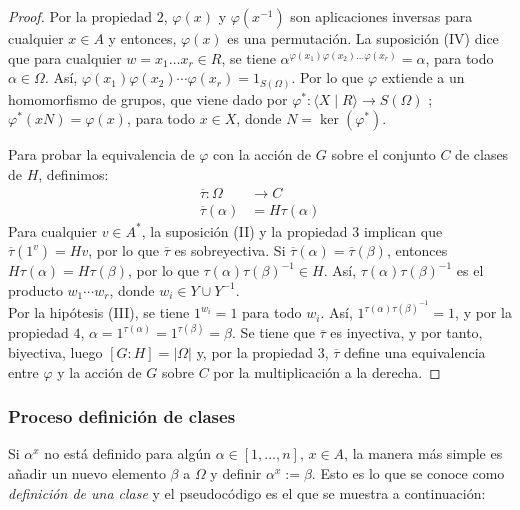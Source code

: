         \begin{proof}
        Por la propiedad $2$, $\varphi(x)$ y $\varphi(x^{-1})$ son aplicaciones inversas para cualquier $x\in A$ y entonces, $\varphi(x)$ es una permutación. La suposición (\RN{4}) dice que para cualquier $w=x_1 \ldots x_r \in R$, se tiene $\alpha^{\varphi(x_1) \varphi(x_2) \ldots \varphi(x_r)}=\alpha$, para todo $\alpha \in \Omega$. Así, $\varphi(x_1)\varphi(x_2)\cdots \varphi(x_r)=1_{S(\Omega)}$. Por lo que $\varphi$ extiende a un homomorfismo de grupos, que viene dado por $\varphi^* \colon \langle X \mid R \rangle \rightarrow S(\Omega)$ ; $\varphi^*(xN)=\varphi(x)$, para todo $x \in X $, donde $N=\operatorname{ker}(\varphi^*)$.
        
        Para probar la equivalencia de $\varphi$ con la acción de $G$ sobre el conjunto $C$ de clases de $H$, definimos:
        \begin{align*}
            \overline{\tau} \colon \Omega & \to C \\
            \overline{\tau}(\alpha) & = H \tau(\alpha) 
        \end{align*}
        Para cualquier $v \in A^*$, la suposición (\RN{2}) y la propiedad $3$ implican que $\overline{\tau}(1^v)=Hv$, por lo que $\overline{\tau}$ es sobreyectiva. Si  $\overline{\tau}(\alpha)= \overline{\tau}(\beta)$, entonces $H\tau(\alpha)=H\tau(\beta)$, por lo que $\tau(\alpha)\tau(\beta)^{-1} \in H$. Así, $\tau(\alpha)\tau(\beta)^{-1}$ es el producto $w_1\cdots w_r$, donde $w_i \in Y\cup Y^{-1}$. \\
        Por la hipótesis  (\RN{3}), se tiene $1^{w_i}=1$ para todo $w_i$. Así, $1^{\tau(\alpha)\tau(\beta)^{-1}}=1$, y por la propiedad $4$, $\alpha=1^{\tau(\alpha)}=1^{\tau(\beta)}=\beta$. Se tiene que $\overline{\tau}$ es inyectiva, y por tanto, biyectiva, luego $[G:H]=|\Omega|$ y, por la propiedad $3$, $\overline{\tau}$ define una equivalencia entre $\varphi$ y la acción de $G$ sobre $C$ por la multiplicación a la derecha.
        \end{proof}






\newpage
\subsubsection{Proceso definición de clases} 

Si $\alpha^x$ no está definido para algún $\alpha \in [1,\ldots,n]$, $x\in A$, la manera más simple es añadir un nuevo elemento $\beta$ a $\Omega$ y definir $\alpha^x:= \beta$. Esto es lo que se conoce como \textit{definición de una clase} y el pseudocódigo es el que se muestra a continuación: 

